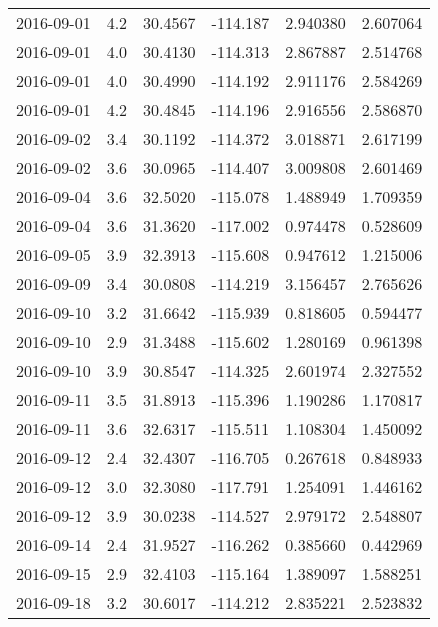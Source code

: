 \begin{tabular}{lrrrrr}
2016-09-01 &       4.2 &  30.4567 &  -114.187 &         2.940380 &         2.607064 \\
2016-09-01 &       4.0 &  30.4130 &  -114.313 &         2.867887 &         2.514768 \\
2016-09-01 &       4.0 &  30.4990 &  -114.192 &         2.911176 &         2.584269 \\
2016-09-01 &       4.2 &  30.4845 &  -114.196 &         2.916556 &         2.586870 \\
2016-09-02 &       3.4 &  30.1192 &  -114.372 &         3.018871 &         2.617199 \\
2016-09-02 &       3.6 &  30.0965 &  -114.407 &         3.009808 &         2.601469 \\
2016-09-04 &       3.6 &  32.5020 &  -115.078 &         1.488949 &         1.709359 \\
2016-09-04 &       3.6 &  31.3620 &  -117.002 &         0.974478 &         0.528609 \\
2016-09-05 &       3.9 &  32.3913 &  -115.608 &         0.947612 &         1.215006 \\
2016-09-09 &       3.4 &  30.0808 &  -114.219 &         3.156457 &         2.765626 \\
2016-09-10 &       3.2 &  31.6642 &  -115.939 &         0.818605 &         0.594477 \\
2016-09-10 &       2.9 &  31.3488 &  -115.602 &         1.280169 &         0.961398 \\
2016-09-10 &       3.9 &  30.8547 &  -114.325 &         2.601974 &         2.327552 \\
2016-09-11 &       3.5 &  31.8913 &  -115.396 &         1.190286 &         1.170817 \\
2016-09-11 &       3.6 &  32.6317 &  -115.511 &         1.108304 &         1.450092 \\
2016-09-12 &       2.4 &  32.4307 &  -116.705 &         0.267618 &         0.848933 \\
2016-09-12 &       3.0 &  32.3080 &  -117.791 &         1.254091 &         1.446162 \\
2016-09-12 &       3.9 &  30.0238 &  -114.527 &         2.979172 &         2.548807 \\
2016-09-14 &       2.4 &  31.9527 &  -116.262 &         0.385660 &         0.442969 \\
2016-09-15 &       2.9 &  32.4103 &  -115.164 &         1.389097 &         1.588251 \\
2016-09-18 &       3.2 &  30.6017 &  -114.212 &         2.835221 &         2.523832 \\

\end{tabular}
